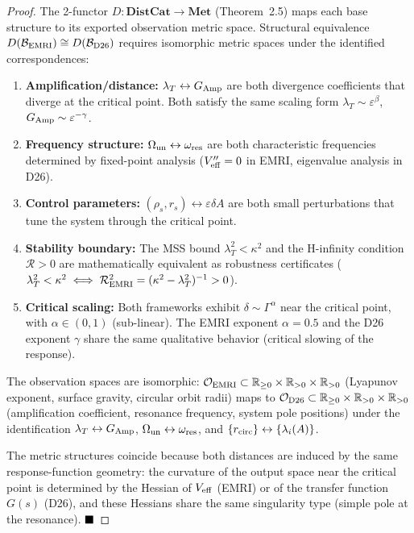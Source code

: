 \documentclass[
]{article}
\begin{document}
\begin{proof}
The 2-functor $D: \mathbf{DistCat} \to \mathbf{Met}$ (Theorem~2.5) maps each base structure to its exported observation metric space. Structural equivalence $D(\mathcal{B}_{\rm EMRI}) \cong D(\mathcal{B}_{\rm D26})$ requires isomorphic metric spaces under the identified correspondences:
\begin{enumerate}
\item \textbf{Amplification/distance:} $\lambda_T \leftrightarrow G_{\rm Amp}$ are both divergence coefficients that diverge at the critical point. Both satisfy the same scaling form $\lambda_T \sim \varepsilon^\beta$, $G_{\rm Amp} \sim \varepsilon^{-\gamma}$.
\item \textbf{Frequency structure:} $\Omega_{\rm un} \leftrightarrow \omega_{\rm res}$ are both characteristic frequencies determined by fixed-point analysis ($V_{\rm eff}'' = 0$ in EMRI, eigenvalue analysis in D26).
\item \textbf{Control parameters:} $(\rho_s, r_s) \leftrightarrow \varepsilon\delta A$ are both small perturbations that tune the system through the critical point.
\item \textbf{Stability boundary:} The MSS bound $\lambda_T^2 < \kappa^2$ and the H-infinity condition $\mathcal{R} > 0$ are mathematically equivalent as robustness certificates ($\lambda_T^2 < \kappa^2 \iff \mathcal{R}_{\rm EMRI}^2 = (\kappa^2 - \lambda_T^2)^{-1} > 0$).
\item \textbf{Critical scaling:} Both frameworks exhibit $\delta \sim \Gamma^\alpha$ near the critical point, with $\alpha \in (0, 1)$ (sub-linear). The EMRI exponent $\alpha = 0.5$ and the D26 exponent $\gamma$ share the same qualitative behavior (critical slowing of the response).
\end{enumerate}

The observation spaces are isomorphic: $\mathcal{O}_{\rm EMRI} \subset \mathbb{R}_{\geq 0} \times \mathbb{R}_{>0} \times \mathbb{R}_{>0}$ (Lyapunov exponent, surface gravity, circular orbit radii) maps to $\mathcal{O}_{\rm D26} \subset \mathbb{R}_{\geq 0} \times \mathbb{R}_{>0} \times \mathbb{R}_{>0}$ (amplification coefficient, resonance frequency, system pole positions) under the identification $\lambda_T \leftrightarrow G_{\rm Amp}$, $\Omega_{\rm un} \leftrightarrow \omega_{\rm res}$, and $\{r_{\rm circ}\} \leftrightarrow \{\lambda_i(A)\}$.

The metric structures coincide because both distances are induced by the same response-function geometry: the curvature of the output space near the critical point is determined by the Hessian of $V_{\rm eff}$ (EMRI) or of the transfer function $G(s)$ (D26), and these Hessians share the same singularity type (simple pole at the resonance). $\hfill\blacksquare$
\end{proof}
\end{document}
